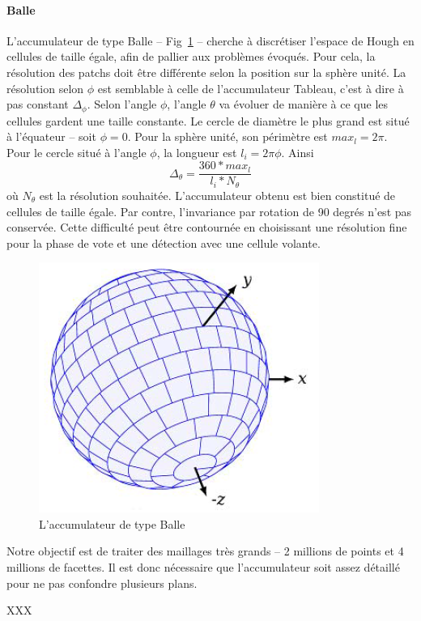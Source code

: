 ﻿\documentclass[12pt, twoside]{article}
\begin{document}
\paragraph{Balle}
L’accumulateur de type Balle -- Fig~\ref{fig:Ball} -- cherche à discrétiser l’espace de Hough en cellules de taille égale, afin de pallier aux problèmes évoqués. Pour cela, la résolution des patchs doit être différente selon la position sur la sphère unité. La résolution selon $\phi$ est semblable à celle de l’accumulateur Tableau, c’est à dire à pas constant $\Delta_{\phi}$. Selon l’angle $\phi$, l’angle $\theta$ va évoluer de manière à ce que les cellules gardent une taille constante. Le cercle de diamètre le plus grand est situé à l’équateur -- soit $\phi = 0$. Pour la sphère unité, son périmètre est $max_l = 2\pi$. Pour le cercle situé à l’angle $\phi$, la longueur est $l_i = 2\pi \phi$. Ainsi
$$\Delta_{\theta} = \dfrac{360*max_l}{l_i*N_{\theta}}$$
où $N_{\theta}$ est la résolution souhaitée. L’accumulateur obtenu est bien constitué de cellules de taille égale. Par contre, l’invariance par rotation de 90 degrés n’est pas conservée. Cette difficulté peut être contournée en choisissant une résolution fine pour la phase de vote et une détection avec une cellule volante.

\begin{figure}[h]
\centering
\includegraphics[scale=0.65]{Ball.png}
\caption{\label{fig:Ball} L'accumulateur de type Balle}
\end{figure}

Notre objectif est de traiter des maillages très grands -- 2 millions de points et 4 millions de facettes. Il est donc nécessaire que l'accumulateur soit assez détaillé pour ne pas confondre plusieurs plans.

XXX
\end{document}
